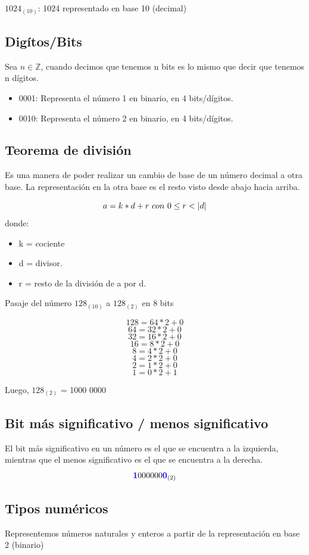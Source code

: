 \documentclass[10pt,a4paper]{article}
\begin{document}
\(1024_{(10)}\): 1024 representado en base 10 (decimal)

    
\subsection*{Digítos/Bits}
Sea \( n \in \mathbb{Z} \), cuando decimos que tenemos n bits es lo mismo que decir que tenemos n dígitos.
\\
\begin{itemize}
\item 0001: Representa el número 1 en binario, en 4 bits/dígitos.
\item 0010: Representa el número 2 en binario, en 4 bits/dígitos.
\end{itemize}

\subsection*{Teorema de división}
Es una manera de poder realizar un cambio de base de un número decimal a otra base. La representación en la otra base es el resto visto desde abajo hacia arriba.

\[a = k \ast d + r \ con \ 0 \le r < |d|\] donde:
\begin{itemize}
    \item k = cociente
    \item d = divisor.
    \item r = resto de la división de a por d.
  \end{itemize}

Pasaje del número \(128_{(10)}\) a \(128_{(2)}\) en 8 bits

\[128 = 64 \ast 2 + 0\]
\[64 = 32 \ast 2 + 0\]
\[32 = 16 \ast 2 + 0\]
\[16 = 8 \ast 2 + 0\]
\[8 = 4 \ast 2 + 0\]
\[4 = 2 \ast 2 + 0\]
\[2 = 1 \ast 2 + 0\]
\[1 = 0 \ast 2 + 1\]

Luego, \(128_{(2)}\) = 1000 0000

\subsection*{Bit más significativo / menos significativo}
El bit más significativo en un número es el que se encuentra a la izquierda, mientras que el menos significativo es el que se encuentra a la derecha.
\[\textcolor{blue}{\textbf{1}}000 000\textcolor{blue}{\textbf{0}}_{(2)}\]


\subsection*{Tipos numéricos}
Representemos números naturales y enteros a partir de la representación en base 2 (binario) \\
\end{document}
